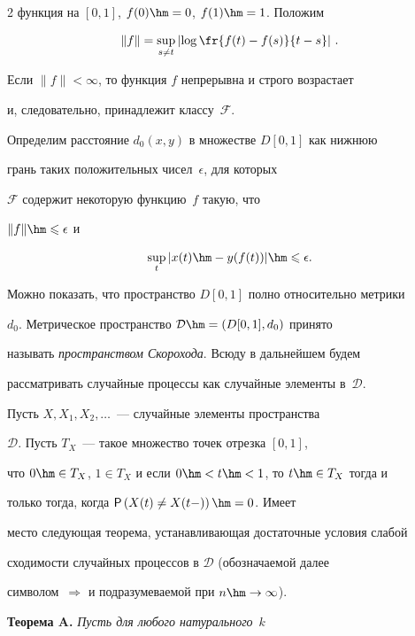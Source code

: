 \begin{multicols}{2}
функция на $[0,1]$,   $f(0)\hm=0$, $f(1)\hm=1$. Положим

$$

\|f\|=\sup\limits_{s\neq t}\left|\log\fr{f(t)-f(s)}{t-s}\right|\,.

$$

Если $\|f\|<\infty$, то функция $f$ непрерывна и строго возрастает

и, следовательно, принадлежит классу~$\mathcal{F}$.



Определим расстояние $d_0(x,y)$ в множестве $D[0,1]$ как нижнюю

грань таких положительных чисел~$\epsilon$, для которых

$\mathcal{F}$ содержит некоторую функцию~$f$ такую, что

$\|f\|\hm\leqslant\epsilon$ и

$$

\sup\limits_t|x(t)\hm-y(f(t))|\hm\leqslant\epsilon.

$$

Можно показать, что пространство $D[0,1]$ полно относительно метрики

$d_0$. Метрическое пространство $\mathcal{D}\hm=(D[0,1],d_0)$ принято

называть {\it пространством Скорохода}. Всюду в дальнейшем будем

рассматривать случайные процессы как случайные элементы в~$\mathcal{D}$.



Пусть $X, X_1,X_2,\ldots$~--- случайные элементы пространства

$\mathcal{D}$. Пусть $T_X$~--- такое множество точек отрезка $[0,1]$,

что $0\hm\in T_X$, $1\in T_X$ и если $0\hm<t\hm<1$, то $t\hm\in T_X$ тогда и

только тогда, когда ${\sf P}\left(X(t)\neq X(t-)\right)\hm=0$. Имеет

место следующая тео\-ре\-ма, устанавливающая достаточные условия слабой

сходимости случайных процессов в $\mathcal{D}$ (обозначаемой далее

символом~$\Longrightarrow$ и подразумеваемой при $n\hm\to\infty$).



\smallskip



\noindent

\textbf{Теорема A.} \textit{Пусть для любого натурального}~$k$


\end{multicols}
